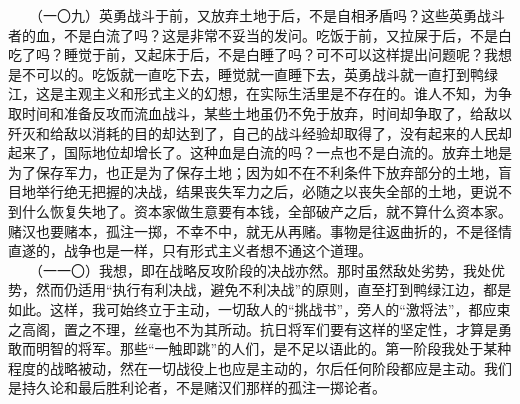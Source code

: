 \documentclass[cn,11pt,chinese]{elegantbook}
\begin{document}
　　（一〇九）英勇战斗于前，又放弃土地于后，不是自相矛盾吗？这些英勇战斗者的血，不是白流了吗？这是非常不妥当的发问。吃饭于前，又拉屎于后，不是白吃了吗？睡觉于前，又起床于后，不是白睡了吗？可不可以这样提出问题呢？我想是不可以的。吃饭就一直吃下去，睡觉就一直睡下去，英勇战斗就一直打到鸭绿江，这是主观主义和形式主义的幻想，在实际生活里是不存在的。谁人不知，为争取时间和准备反攻而流血战斗，某些土地虽仍不免于放弃，时间却争取了，给敌以歼灭和给敌以消耗的目的却达到了，自己的战斗经验却取得了，没有起来的人民却起来了，国际地位却增长了。这种血是白流的吗？一点也不是白流的。放弃土地是为了保存军力，也正是为了保存土地；因为如不在不利条件下放弃部分的土地，盲目地举行绝无把握的决战，结果丧失军力之后，必随之以丧失全部的土地，更说不到什么恢复失地了。资本家做生意要有本钱，全部破产之后，就不算什么资本家。赌汉也要赌本，孤注一掷，不幸不中，就无从再赌。事物是往返曲折的，不是径情直遂的，战争也是一样，只有形式主义者想不通这个道理。\\
　　（一一〇）我想，即在战略反攻阶段的决战亦然。那时虽然敌处劣势，我处优势，然而仍适用“执行有利决战，避免不利决战”的原则，直至打到鸭绿江边，都是如此。这样，我可始终立于主动，一切敌人的“挑战书”，旁人的“激将法”，都应束之高阁，置之不理，丝毫也不为其所动。抗日将军们要有这样的坚定性，才算是勇敢而明智的将军。那些“一触即跳”的人们，是不足以语此的。第一阶段我处于某种程度的战略被动，然在一切战役上也应是主动的，尔后任何阶段都应是主动。我们是持久论和最后胜利论者，不是赌汉们那样的孤注一掷论者。\\
\end{document}
